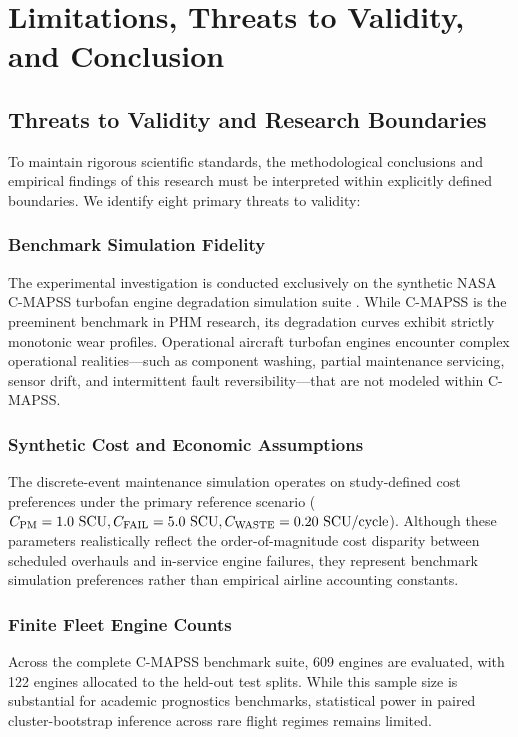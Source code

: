 \chapter{Limitations, Threats to Validity, and Conclusion}
\label{chap:limitations_conclusion}

\section{Threats to Validity and Research Boundaries}
To maintain rigorous scientific standards, the methodological conclusions and empirical findings of this research must be interpreted within explicitly defined boundaries. We identify eight primary threats to validity:

\subsection{Benchmark Simulation Fidelity}
The experimental investigation is conducted exclusively on the synthetic NASA C-MAPSS turbofan engine degradation simulation suite \cite{saxena2008damage}. While C-MAPSS is the preeminent benchmark in PHM research, its degradation curves exhibit strictly monotonic wear profiles. Operational aircraft turbofan engines encounter complex operational realities—such as component washing, partial maintenance servicing, sensor drift, and intermittent fault reversibility—that are not modeled within C-MAPSS.

\subsection{Synthetic Cost and Economic Assumptions}
The discrete-event maintenance simulation operates on study-defined cost preferences under the primary reference scenario ($C_{\text{PM}} = 1.0~\text{SCU}, C_{\text{FAIL}} = 5.0~\text{SCU}, C_{\text{WASTE}} = 0.20~\text{SCU}/\text{cycle}$). Although these parameters realistically reflect the order-of-magnitude cost disparity between scheduled overhauls and in-service engine failures, they represent benchmark simulation preferences rather than empirical airline accounting constants.

\subsection{Finite Fleet Engine Counts}
Across the complete C-MAPSS benchmark suite, 609 engines are evaluated, with 122 engines allocated to the held-out test splits. While this sample size is substantial for academic prognostics benchmarks, statistical power in paired cluster-bootstrap inference across rare flight regimes remains limited.

